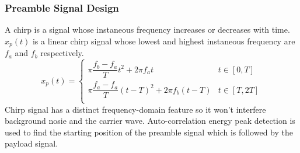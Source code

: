 \subsubsection{Preamble Signal Design}
A chirp is a signal whose instaneous frequency increases or decreases with time.
$x_p(t)$ is a linear chirp signal whose lowest and highest instaneous frequency are $f_a$ and $f_b$ respectively.
\[
	x_p(t) = \begin{cases}
		\pi \dfrac{f_b-f_a}{T} t^2       + 2\pi f_a t     & t\in [0,T]  \\
		\pi \dfrac{f_a-f_a}{T} {(t-T)}^2 + 2\pi f_b (t-T) & t\in [T,2T] \\
	\end{cases}
\]
Chirp signal has a distinct frequency-domain feature so it won't interfere background nosie and the carrier wave.
Auto-correlation energy peak detection is used to find the starting position of the preamble signal which is followed by the payload signal.

